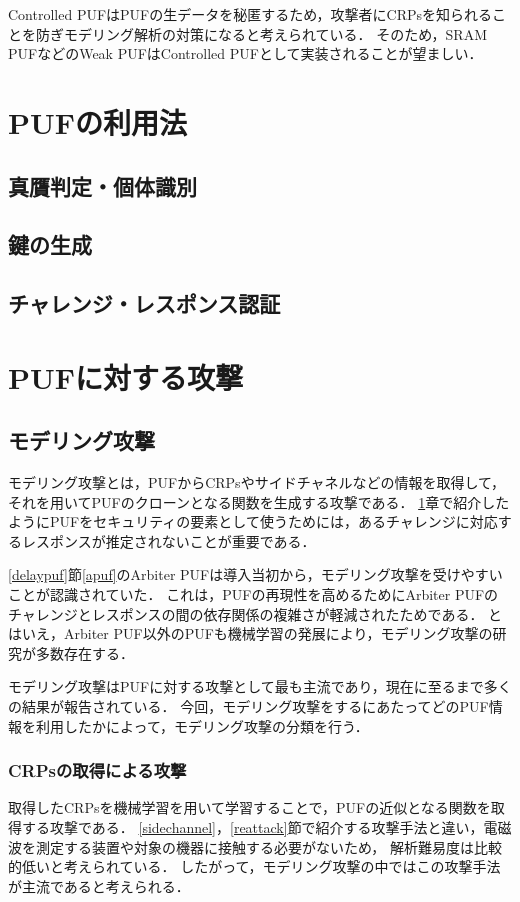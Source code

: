 \documentclass[technicalreport]{ieicej} %
\begin{document}
Controlled PUFはPUFの生データを秘匿するため，攻撃者にCRPsを知られることを防ぎモデリング解析の対策になると考えられている．
そのため，SRAM PUFなどのWeak PUFはControlled PUFとして実装されることが望ましい．
\section{PUFの利用法}
\label{puf use}
\subsection{真贋判定・個体識別}
\subsection{鍵の生成}
\subsection{チャレンジ・レスポンス認証}
\section{PUFに対する攻撃}
\subsection{モデリング攻撃}
モデリング攻撃とは，PUFからCRPsやサイドチャネルなどの情報を取得して，それを用いてPUFのクローンとなる関数を生成する攻撃である．
\ref{puf use}章で紹介したようにPUFをセキュリティの要素として使うためには，あるチャレンジに対応するレスポンスが推定されないことが重要である．

\ref{delaypuf}節\ref{apuf}のArbiter PUFは導入当初から，モデリング攻撃を受けやすいことが認識されていた\cite{maes1}\cite{lim}．
これは，PUFの再現性を高めるためにArbiter PUFのチャレンジとレスポンスの間の依存関係の複雑さが軽減されたためである．
とはいえ，Arbiter PUF以外のPUFも機械学習の発展により，モデリング攻撃の研究が多数存在する．

モデリング攻撃はPUFに対する攻撃として最も主流であり，現在に至るまで多くの結果が報告されている．
今回，モデリング攻撃をするにあたってどのPUF情報を利用したかによって，モデリング攻撃の分類を行う．
\subsubsection{CRPsの取得による攻撃}
取得したCRPsを機械学習を用いて学習することで，PUFの近似となる関数を取得する攻撃である．
\ref{sidechannel}，\ref{reattack}節で紹介する攻撃手法と違い，電磁波を測定する装置や対象の機器に接触する必要がないため，
解析難易度は比較的低いと考えられている\cite{nozaki}．
したがって，モデリング攻撃の中ではこの攻撃手法が主流であると考えられる．
\end{document}
